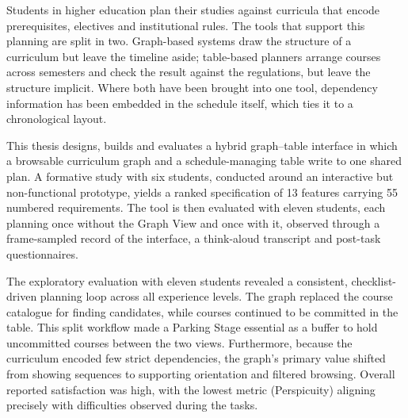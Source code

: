 Students in higher education plan their studies against curricula that encode
prerequisites, electives and institutional rules. The tools that support this
planning are split in two. Graph-based systems draw the structure of a
curriculum but leave the timeline aside; table-based planners arrange courses
across semesters and check the result against the regulations, but leave the
structure implicit. Where both have been brought into one tool, dependency
information has been embedded in the schedule itself, which ties it to a
chronological layout.

This thesis designs, builds and evaluates a hybrid graph--table interface in
which a browsable curriculum graph and a schedule-managing table write to one
shared plan. A formative study with six students,
conducted around an interactive but non-functional prototype, yields a ranked
specification of 13 features carrying 55 numbered requirements. The tool is then
evaluated with eleven students, each planning once without the Graph View and
once with it, observed through a frame-sampled record of the interface, a
think-aloud transcript and post-task questionnaires.

The exploratory evaluation with eleven students revealed a consistent,
checklist-driven planning loop across all experience levels. The graph replaced
the course catalogue for finding candidates, while courses continued to be
committed in the table. This split workflow made a Parking Stage essential as a
buffer to hold uncommitted courses between the two views. Furthermore, because
the curriculum encoded few strict dependencies, the graph's primary value
shifted from showing sequences to supporting orientation and filtered browsing.
Overall reported satisfaction was high, with the lowest metric (Perspicuity)
aligning precisely with difficulties observed during the tasks.
